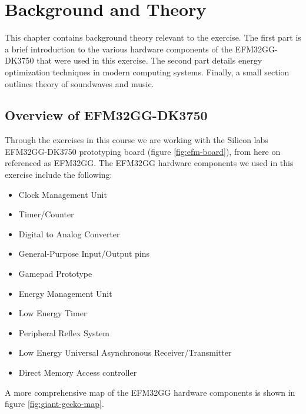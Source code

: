 \chapter{Background and Theory}

This chapter contains background theory relevant to the exercise. The first part is a brief introduction to the various hardware components of the EFM32GG-DK3750 that were used in this exercise. The second part details energy optimization techniques in modern computing systems. Finally, a small section outlines theory of soundwaves and music.


\section{Overview of EFM32GG-DK3750}
Through the exercises in this course we are working with the Silicon labs EFM32GG-DK3750 prototyping board (figure \ref{fig:efm-board}), from here on referenced as EFM32GG. The EFM32GG hardware components we used in this exercise include the following:
\begin{itemize}
	\item Clock Management Unit
	\item Timer/Counter
	\item Digital to Analog Converter
	\item General-Purpose Input/Output pins
	\item Gamepad Prototype
	\item Energy Management Unit
  \item Low Energy Timer
  \item Peripheral Reflex System
  \item Low Energy Universal Asynchronous Receiver/Transmitter
	\item Direct Memory Access controller
\end{itemize}
A more comprehensive map of the EFM32GG hardware components is shown in figure \ref{fig:giant-gecko-map}.

